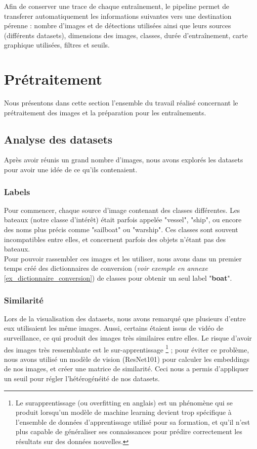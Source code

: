 Afin de conserver une trace de chaque entraînement, le pipeline permet de transferer automatiquement
les informations suivantes vers une destination pérenne : nombre d'images et de détections utilisées
ainsi que leurs sources (différents datasets), dimensions des images, classes, durée d'entraînement,
carte graphique utilisées, filtres et seuils. \\

\section{Prétraitement}

Nous présentons dans cette section l'ensemble du travail réalisé concernant le prétraitement des images
et la préparation pour les entraînements.

\subsection{Analyse des datasets}

Après avoir réunis un grand nombre d'images, nous avons explorés les datasets pour avoir une idée de ce qu'ils contenaient.

\subsubsection{Labels}

Pour commencer, chaque source d'image contenant des classes différentes. Les bateaux
(notre classe d'intérêt) était parfois appelée "vessel", "ship", ou encore des noms plus précis comme "sailboat" ou "warship". Ces classes sont souvent incompatibles entre elles, 
et concernent parfois des objets n'étant pas des bateaux.\\

Pour pouvoir rassembler ces images et les utiliser, nous avons dans un premier temps
créé des dictionnaires de conversion (\textit{voir exemple en annexe }\ref{ex_dictionnaire_conversion}) de classes pour obtenir un seul label "\textbf{boat}".

\subsubsection{Similarité}
\label{similarite}

Lors de la visualisation des datasets, nous avons remarqué que plusieurs d'entre eux utilisaient les
même images. Aussi, certains étaient issus de vidéo de surveillance, ce qui produit des images
très similaires entre elles. Le risque d'avoir des images très ressemblante est le sur-apprentissage
\footnote{Le surapprentissage (ou overfitting en anglais) est un phénomène qui se produit
lorsqu'un modèle de machine learning devient trop spécifique à l'ensemble de données d'apprentissage
utilisé pour sa formation, et qu'il n'est plus capable de généraliser ses connaissances
pour prédire correctement les résultats sur des données nouvelles.} ; pour éviter ce problème,
nous avons utilisé un modèle de vision (ResNet101) pour calculer les embeddings de nos images,
et créer une matrice de similarité. Ceci nous a permis d'appliquer un seuil pour régler l'hétérogénéité
de nos datasets.

